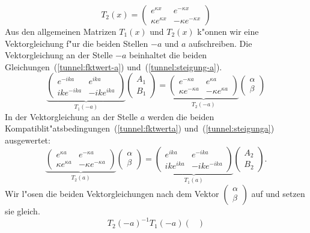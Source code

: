 \begin{refsection}
\[
T_2(x) =
\begin{pmatrix}
e^{\kappa x}
&
e^{-\kappa x}
\\
\kappa e^{\kappa x}
&
-\kappa e^{-\kappa x}
\end{pmatrix}
\]
Aus den allgemeinen Matrizen $T_1(x)$ und $T_2(x)$ k"onnen wir eine Vektorgleichung f"ur die beiden Stellen $-a$ und $a$ aufschreiben.
Die Vektorgleichung an der Stelle $-a$ beinhaltet die beiden Gleichungen~(\ref{tunnel:fktwert-a}) und~(\ref{tunnel:steigung-a}).
\[
\underbrace{
\begin{pmatrix}
e^{-ika}
&
e^{ika}
\\
ike^{-ika}
&
-ike^{ika}
\end{pmatrix}
}_{T_1(-a)}
\begin{pmatrix}
A_1
\\
B_1
\end{pmatrix}
 = 
\underbrace{
\begin{pmatrix}
e^{-\kappa a}
&
e^{\kappa a}
\\
\kappa e^{-\kappa a}
&
-\kappa e^{\kappa a}
\end{pmatrix}
}_{T_2(-a)}
\begin{pmatrix}
\alpha
\\
\beta
\end{pmatrix}
\]
In der Vektorgleichung an der Stelle $a$ werden die beiden Kompatiblit"atsbedingungen~(\ref{tunnel:fktwerta}) und~(\ref{tunnel:steigunga}) ausgewertet:
\[
\underbrace{
\begin{pmatrix}
e^{\kappa a}
&
e^{-\kappa a}
\\
\kappa e^{\kappa a}
&
-\kappa e^{-\kappa a}
\end{pmatrix}
}_{T_2(a)}
\begin{pmatrix}
\alpha
\\
\beta
\end{pmatrix}
 = 
\underbrace{
\begin{pmatrix}
e^{ika}
&
e^{-ika}
\\
ike^{ika}
&
-ike^{-ika}
\end{pmatrix}
}_{T_1(a)}
\begin{pmatrix}
A_2
\\
B_2
\end{pmatrix}.
\]
Wir l"osen die beiden Vektorgleichungen nach dem Vektor
$
\begin{pmatrix}
\alpha
\\
\beta
\end{pmatrix}
$
auf und setzen sie gleich.
\[
T_2(-a)^{-1}T_1(-a)
\begin{pmatrix}

\end{pmatrix}\]
\end{refsection}
